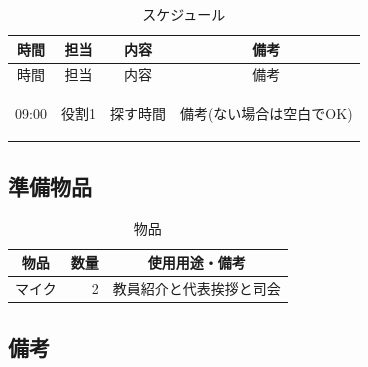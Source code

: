 \begin{longtable}[c]{|p{}|p{}|p{}|p{}|}
  \caption{スケジュール} \\
  \hline
  \multicolumn{1}{|c|}{時間} & \multicolumn{1}{c|}{担当} & \multicolumn{1}{c|}{内容} & \multicolumn{1}{c|}{備考} \\
  \hline
  \endfirsthead
  
  \hline
  \multicolumn{1}{|c|}{時間} & \multicolumn{1}{c|}{担当} & \multicolumn{1}{c|}{内容} & \multicolumn{1}{c|}{備考} \\
  \hline
  \endhead
  
  \hline
  \endfoot
  
  \hline
  \endlastfoot
  
  \begin{tpacol}
    09:00
  \end{tpacol}&
  \begin{tpbcol}
    役割1
  \end{tpbcol}&
  \begin{tpccol}
    探す時間
  \end{tpccol}&
  \begin{tpdcol}
    備考(ない場合は空白でOK)
  \end{tpdcol}\\


\end{longtable}
\normalsize

\subsection{準備物品}
\begin{table}[h]
  \centering
  \caption{物品}
  \begin{tabular}{lrl}
    \hline
    \multicolumn{1}{c}{物品} & \multicolumn{1}{c}{数量} & \multicolumn{1}{c}{使用用途・備考} \\
    \hline
    マイク & 2 & 教員紹介と代表挨拶と司会 \\
    \hline  
  \end{tabular}
\end{table}

\subsection{備考}
